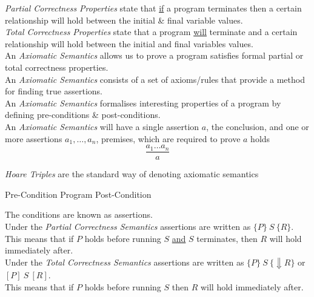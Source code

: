 \documentclass[11pt,a4paper]{article}
\begin{document}
\textit{Partial Correctness Properties} state that \underline{if} a program terminates then a certain relationship will hold between the initial \& final variable values.\\

\textit{Total Correctness Properties} state that a program \underline{will} terminate and a certain relationship will hold between the initial and final variables values.\\

An \textit{Axiomatic Semantics} allows us to prove a program satisfies formal partial or total correctness properties.\\

An \textit{Axiomatic Semantics} consists of a set of axioms/rules that provide a method for finding true assertions.\\
An \textit{Axiomatic Semantics} formalises interesting properties of a program by defining pre-conditions \& post-conditions.\\

An \textit{Axiomatic Semantics} will have a single assertion $a$, the conclusion, and one or more assertions $a_1,\dots,a_n$, premises, which are required to prove $a$ holds
$$\dfrac{a_1\dots a_n}{a}$$

\textit{Hoare Triples} are the standard way of denoting axiomatic semantics
\begin{center}
Pre-Condition Program Post-Condition
\end{center}
\nb The conditions are known as assertions.\\

Under the \textit{Partial Correctness Semantics} assertions are written as $\{P\}\ S\ \{R\}$.\\
This means that if $P$ holds before running $S$ \underline{and} $S$ terminates, then $R$ will hold immediately after.\\

Under the \textit{Total Correctness Semantics} assertions are written as $\{P\}\ S\ \{\Downarrow R\}$ or $[P]\ S\ [R]$.\\
This means that if $P$ holds before running $S$ then $R$ will hold immediately after.\\
\end{document}
